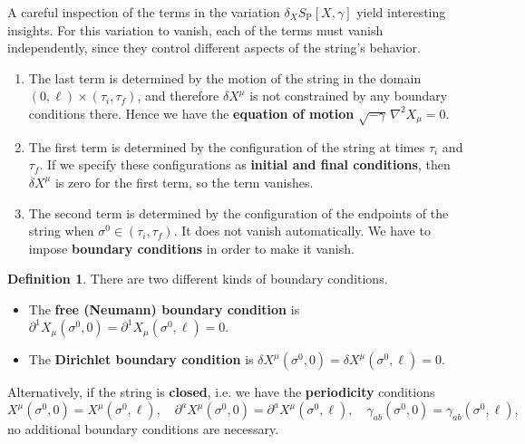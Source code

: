 \documentclass{report}
\theoremstyle{plain}
\theoremstyle{definition}
\newtheorem{definition}[theorem]{Definition}
\theoremstyle{remark}
\newcommand{\di}{\partial}
\begin{document}
A careful inspection of the terms in the variation $\delta_X
S_{\text{P}}[X, \gamma]$ yield interesting insights. For this
variation to vanish, each of the terms must vanish independently,
since they control different aspects of the string's behavior.
\begin{enumerate}
\item The last term is determined by the motion of the string in the
  domain $(0, \ell) \times (\tau_i, \tau_f)$, and therefore $\delta
  X^\mu$ is not constrained by any boundary conditions there. Hence we
  have the {\bf equation of motion} $\sqrt{-\gamma} \, \nabla^2 X_\mu
  = 0$.
\item The first term is determined by the configuration of the string
  at times $\tau_i$ and $\tau_f$. If we specify these configurations
  as {\bf initial and final conditions}, then $\delta X^\mu$ is zero
  for the first term, so the term vanishes.
\item The second term is determined by the configuration of the
  endpoints of the string when $\sigma^0 \in (\tau_i, \tau_f)$. It
  does not vanish automatically. We have to impose {\bf boundary
    conditions} in order to make it vanish.
\end{enumerate}

\begin{definition}
  There are two different kinds of boundary conditions.
  \begin{itemize}
  \item The {\bf free (Neumann) boundary condition} is $\di^1
    X_\mu(\sigma^0, 0) = \di^1 X_\mu(\sigma^0, \ell) = 0$.
  \item The {\bf Dirichlet boundary condition} is $\delta
    X^\mu(\sigma^0, 0) = \delta X^\mu(\sigma^0, \ell) = 0$.
  \end{itemize}
  Alternatively, if the string is {\bf closed}, i.e. we have the {\bf
    periodicity} conditions
  \[ X^\mu(\sigma^0, 0) = X^\mu(\sigma^0, \ell), \quad \di^a X^\mu(\sigma^0, 0) = \di^a X^\mu(\sigma^0, \ell), \quad \gamma_{ab}(\sigma^0, 0) = \gamma_{ab}(\sigma^0, \ell), \]
  no additional boundary conditions are necessary.
\end{definition}
\end{document}
